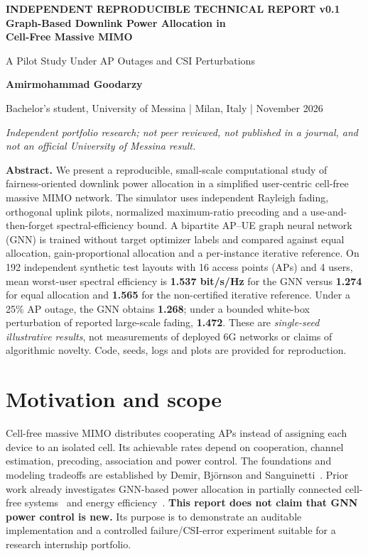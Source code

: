 \documentclass[10pt,a4paper]{article}
\newcommand{\sect}[1]{\vspace{3pt}\section{\color{navy}#1}}
\begin{document}
\begin{center}
{\small\color{teal}\textbf{INDEPENDENT REPRODUCIBLE TECHNICAL REPORT \;\textbullet\; v0.1}}\\[8pt]
{\LARGE\bfseries\color{navy}Graph-Based Downlink Power Allocation in\\[2pt] Cell-Free Massive MIMO}\par
\vspace{5pt}
{\large A Pilot Study Under AP Outages and CSI Perturbations}\par
\vspace{10pt}
{\bfseries Amirmohammad Goodarzy}\par
{\small Bachelor's student, University of Messina \;|\; Milan, Italy \;| November 2026}\par
\vspace{5pt}
{\footnotesize \textit{Independent portfolio research; not peer reviewed, not published in a journal, and not an official University of Messina result.}}
\end{center}
\vspace{2pt}
\noindent\colorbox{navy!6}{\parbox{0.966\linewidth}{\small\textbf{Abstract.}\; We present a reproducible, small-scale computational study of fairness-oriented downlink power allocation in a simplified user-centric cell-free massive MIMO network. The simulator uses independent Rayleigh fading, orthogonal uplink pilots, normalized maximum-ratio precoding and a use-and-then-forget spectral-efficiency bound. A bipartite AP--UE graph neural network (GNN) is trained without target optimizer labels and compared against equal allocation, gain-proportional allocation and a per-instance iterative reference. On 192 independent synthetic test layouts with 16 access points (APs) and 4 users, mean worst-user spectral efficiency is \textbf{1.537 bit/s/Hz} for the GNN versus \textbf{1.274} for equal allocation and \textbf{1.565} for the non-certified iterative reference. Under a 25\% AP outage, the GNN obtains \textbf{1.268}; under a bounded white-box perturbation of reported large-scale fading, \textbf{1.472}. These are \emph{single-seed illustrative results}, not measurements of deployed 6G networks or claims of algorithmic novelty. Code, seeds, logs and plots are provided for reproduction.}}

\sect{Motivation and scope}
Cell-free massive MIMO distributes cooperating APs instead of assigning each device to an isolated cell. Its achievable rates depend on cooperation, channel estimation, precoding, association and power control. The foundations and modeling tradeoffs are established by Demir, Bj\"ornson and Sanguinetti~\cite{demir2021}. Prior work already investigates GNN-based power allocation in partially connected cell-free systems~\cite{mishra2024} and energy efficiency~\cite{raghunath2024}. \textbf{This report does not claim that GNN power control is new.} Its purpose is to demonstrate an auditable implementation and a controlled failure/CSI-error experiment suitable for a research internship portfolio.
\end{document}
